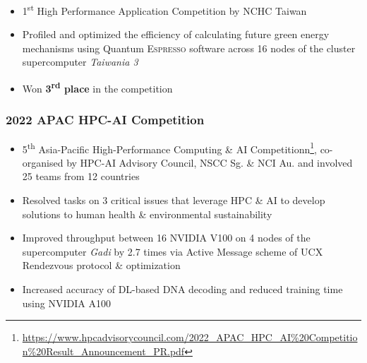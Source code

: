 \documentclass[12pt, a4paper]{article}
\begin{document}
\begin{itemize}
\item 1\textsuperscript{st} High Performance Application Competition by NCHC Taiwan
\item Profiled and optimized the efficiency of calculating future green energy mechanisms using Quantum \textsc{Espresso} software across 16 nodes of the cluster supercomputer \emph{Taiwania 3}
\item Won \textbf{3\textsuperscript{rd} place} in the competition
\end{itemize}

\subsubsection{2022 APAC HPC-AI Competition}

%

\renewcommand\UrlFont{\ttfamily\scriptsize}

\begin{itemize}
\item 5\textsuperscript{th} Asia-Pacific High-Performance Computing \& AI Competitionn\footnote{\url{https://www.hpcadvisorycouncil.com/2022_APAC_HPC_AI\%20Competition\%20Result_Announcement_PR.pdf}}, co-organised by HPC-AI Advisory Council, NSCC Sg. \& NCI Au. and involved 25 teams from 12 countries
\item Resolved tasks on 3 critical issues that leverage HPC \& AI to develop solutions to human health \& environmental sustainability
\item Improved throughput between 16 \textsf{NVIDIA V100} on 4 nodes of the supercomputer \emph{Gadi} by 2.7 times via Active Message scheme of \textsf{UCX} Rendezvous protocol \& optimization
\item Increased accuracy of DL-based DNA decoding and reduced training time using \textsf{NVIDIA A100}
\end{itemize}
\end{document}
